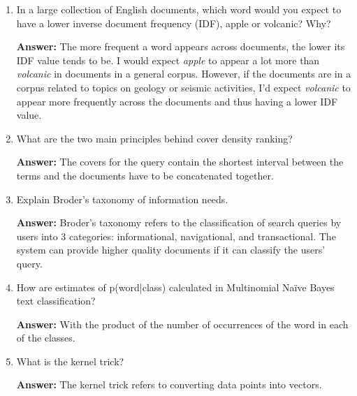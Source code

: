 \documentclass[11pt]{article}
\begin{document}
\begin{enumerate}
\begin{enumerate}
          \item In a large collection of English documents, which word would you expect to have a lower inverse document frequency (IDF), apple or volcanic? Why?

                \textbf{Answer:} The more frequent a word appears across documents, the lower its IDF value tends to be. I would expect \textit{apple} to appear a lot more than \textit{volcanic} in documents in a general corpus. However, if the documents are in a corpus related to topics on geology or seismic activities, I'd expect \textit{volcanic} to appear more frequently across the documents and thus having a lower IDF value.

          \item What are the two main principles behind cover density ranking?

                \textbf{Answer:} The covers for the query contain the shortest interval between the terms and the documents have to be concatenated together.

          \item Explain Broder's taxonomy of information needs.

                \textbf{Answer:} Broder's taxonomy refers to the classification of search queries by users into 3 categories: informational, navigational, and transactional. The system can provide higher quality documents if it can classify the users' query.

          \item How are estimates of p(word|class) calculated in Multinomial Naïve Bayes text classification?

                \textbf{Answer:} With the product of the number of occurrences of the word in each of the classes.

          \item What is the kernel trick?

                \textbf{Answer:} The kernel trick refers to converting data points into vectors.

        \end{enumerate}

\end{enumerate}
\end{document}

